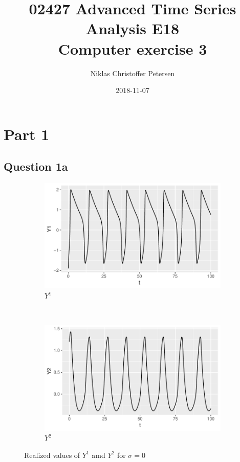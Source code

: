 \documentclass[a4paper]{article}
\title{{\small 02427 Advanced Time Series Analysis E18}\\Computer exercise 3}
\author{Niklas Christoffer Petersen}
\date{2018-11-07}
\begin{document}
\maketitle

\section{Part 1}

\subsection{Question 1a}

\begin{figure}[ht!]
    \centering
    \begin{subfigure}[b]{0.45\textwidth}
        \includegraphics[width=\textwidth]{part1a-sigma0-Y1.pdf}
        \caption{$Y^1$}
    \end{subfigure}
    ~
    \begin{subfigure}[b]{0.45\textwidth}
        \includegraphics[width=\textwidth]{part1a-sigma0-Y2.pdf}
        \caption{$Y^2$}
    \end{subfigure}
    \caption{Realized values of $Y^1$ amd $Y^2$ for $\sigma = 0$}\label{fig:part1a-sigma0}
\end{figure}
\end{document}

